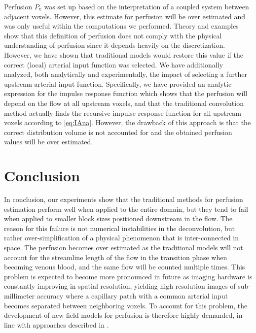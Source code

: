 \documentclass[journal,twocolumn]{IEEEtran}
\newcommand{\Perfv}{P_{\mathrm{v}}}
\begin{document}
	Perfusion $\Perfv$ was set up based on the interpretation of a coupled system between adjacent voxels. However, this estimate for perfusion will be over estimated and was only useful within the computations we performed.
	Theory and examples show that this definition of perfusion does not comply with the physical understanding of perfusion since it depends heavily on the discretization.
	However, we have shown that traditional models would restore this value if the correct (local) arterial input function was selected.
	We have additionally analyzed, both analytically and experimentally, the impact of selecting a further upstream arterial input function.
	Specifically, we have provided an analytic expression for the impulse response function which shows that the perfusion will depend on the flow at all upstream voxels, and that the traditional convolution method actually finds the recursive impulse response function for all upstream voxels according to \eqref{eq:IAna}. However, the drawback of this approach is that the correct distribution volume is not accounted for and the obtained perfusion values will be over estimated.
	
	\section{Conclusion}
	In conclusion, our experiments show that the traditional methods for perfusion estimation perform well when applied to the entire domain, but they tend to fail when applied to smaller block sizes positioned downstream in the flow. The reason for this failure is not numerical instabilities in the deconvolution, but rather over-simplification of a physical phenomenon that is inter-connected in space.  The perfusion becomes over estimated as the traditional models will not account for the streamline length of the flow in the transition phase when becoming venous blood, and the same flow will be counted multiple times. This problem is expected to become more pronounced in future as imaging hardware is constantly improving in spatial resolution, yielding high resolution images of sub-millimeter accuracy where a capillary patch with a common arterial input becomes separated between neighboring voxels. 
	To account for this problem, the development of new field models for perfusion is therefore highly demanded, in line with approaches described in \cite{sourbron14,Michler2013}. 	
	
	


	
		
	
	
\end{document}

